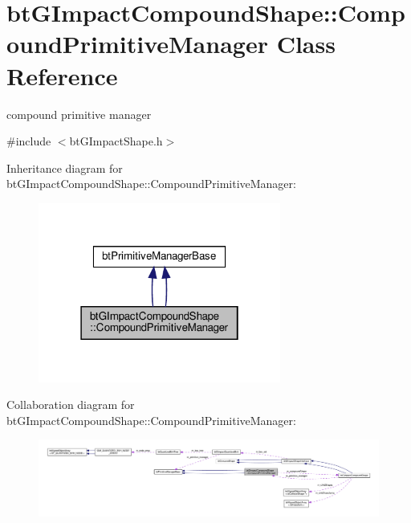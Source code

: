 \hypertarget{classbtGImpactCompoundShape_1_1CompoundPrimitiveManager}{}\section{bt\+G\+Impact\+Compound\+Shape\+:\+:Compound\+Primitive\+Manager Class Reference}
\label{classbtGImpactCompoundShape_1_1CompoundPrimitiveManager}


compound primitive manager  




{\ttfamily \#include $<$bt\+G\+Impact\+Shape.\+h$>$}



Inheritance diagram for bt\+G\+Impact\+Compound\+Shape\+:\+:Compound\+Primitive\+Manager\+:
\nopagebreak
\begin{figure}[H]
\begin{center}
\leavevmode
\includegraphics[width=226pt]{classbtGImpactCompoundShape_1_1CompoundPrimitiveManager__inherit__graph}
\end{center}
\end{figure}


Collaboration diagram for bt\+G\+Impact\+Compound\+Shape\+:\+:Compound\+Primitive\+Manager\+:
\nopagebreak
\begin{figure}[H]
\begin{center}
\leavevmode
\includegraphics[width=350pt]{classbtGImpactCompoundShape_1_1CompoundPrimitiveManager__coll__graph}
\end{center}
\end{figure}
